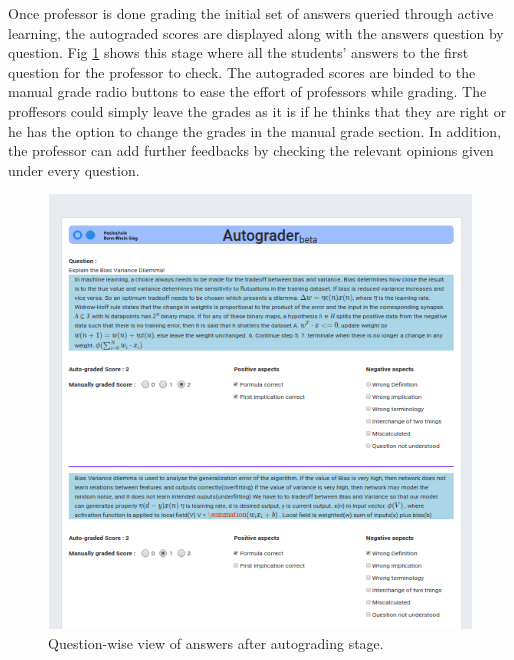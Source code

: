 	Once professor is done grading the initial set of answers queried through active learning, the autograded scores are displayed along with the answers question by question. Fig \ref{gui_2} shows this stage where all the students' answers to the first question for the professor to check. The autograded scores are binded to the manual grade radio buttons to ease the effort of professors while grading. The proffesors could simply leave the grades as it is if he thinks that they are right or he has the option to change the grades in the manual grade section. In addition, the professor can add further feedbacks by checking the relevant opinions given under every question. 
	
	\begin{figure}[!htb]
		\centering
		\includegraphics[scale=0.38]{images/gui_2}
		\caption{Question-wise view of answers after autograding stage.}
		\label{gui_2}
	\end{figure} 
	
